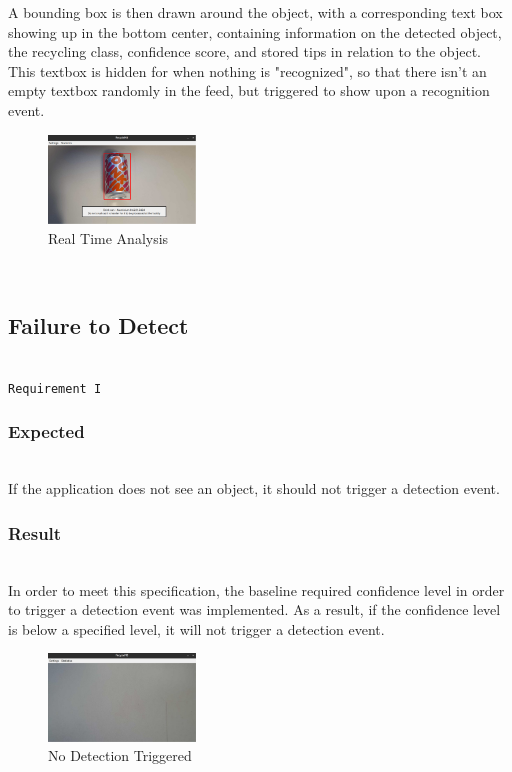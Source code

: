 \documentclass[conference]{IEEEtran}
\begin{document}
A bounding box is then drawn around the object, with a corresponding text box showing up in the bottom center, containing information on the detected object, the recycling class, confidence score, and stored tips in relation to the object. This textbox is hidden for when nothing is "recognized", so that there isn't an empty textbox randomly in the feed, but triggered to show upon a recognition event.~\\
 
\begin{figure}[!h]
    \centering
    \includegraphics[width=0.35\textwidth]{images/successful_detection.eps}
    \caption{Real Time Analysis}
\end{figure}~\\

\subsection{Failure to Detect}~\\
\texttt{Requirement I}~\\
\subsubsection{Expected}~\\
If the application does not see an object, it should not trigger a detection event.~\\

\subsubsection{Result}~\\
In order to meet this specification, the baseline required confidence level in order to trigger a detection event was implemented. As a result, if the confidence level is below a specified level, it will not trigger a detection event.

\begin{figure}[!h]
    \centering
    \includegraphics[width=0.35\textwidth]{images/nothing_detected.eps}
    \caption{No Detection Triggered}
\end{figure}~\\
\end{document}
